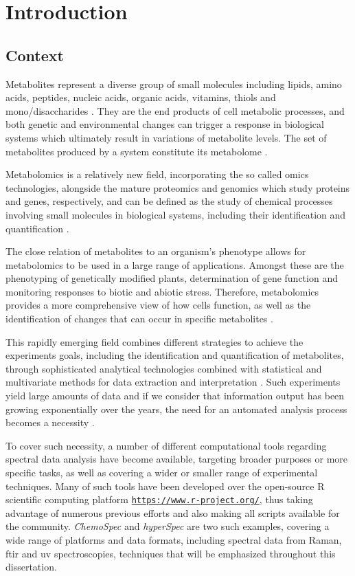 \chapter{Introduction}
\section{Context}

Metabolites represent a diverse group of small molecules including lipids, amino acids, peptides, nucleic acids, organic acids, vitamins, thiols and mono/disaccharides \citep{zhang2012modern}. They are the end products of cell metabolic processes, and both genetic and environmental changes can trigger a response in biological systems which ultimately result in variations of metabolite levels. The set of metabolites produced by a system constitute its metabolome \citep{fiehn2002metabolomics}.

Metabolomics is a relatively new field, incorporating the so called omics technologies, alongside the mature proteomics and genomics which study proteins and genes, respectively,  and can be defined as the study of chemical processes involving small molecules in biological systems, including their identification and quantification \citep{daviss2005growing}.

The close relation of metabolites to an organism's phenotype \citep{fiehn2002metabolomics} allows for metabolomics to be used in a large range of applications. Amongst these are the phenotyping of genetically modified plants, determination of gene function and monitoring responses to biotic and abiotic stress. Therefore, metabolomics provides a more comprehensive view of how cells function, as well as the identification of changes that can occur in specific metabolites \citep{roessner2009metabolomics}.

This rapidly emerging field combines different strategies to achieve the experiments goals, including the identification and quantification of metabolites, through sophisticated analytical technologies combined with statistical and multivariate methods for data extraction and interpretation \citep{roessner2009metabolomics}. Such experiments yield large amounts of data and if we consider that information output has been growing exponentially over the years, the need for an automated analysis process becomes a necessity \citep{larsen2010rate}.

To cover such necessity, a number of different computational tools regarding spectral data analysis have become available, targeting broader purposes or more specific tasks, as well
as covering a wider or smaller range of experimental techniques. Many of such tools have been developed over the open-source R scientific computing platform \href{https://www.r-project.org/}{\nolinkurl{https://www.r-project.org/}}, thus taking advantage of numerous previous efforts and also making all scripts available for the community. \textit{ChemoSpec} and \textit{hyperSpec} are two such examples, covering a wide range of platforms and data formats, including spectral data from Raman, \gls{ftir} and \gls{uv} spectroscopies, techniques that will be emphasized throughout this dissertation. 

